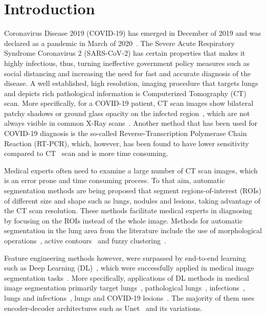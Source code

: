 \documentclass{elsarticle}
\begin{document}
\section{Introduction}\label{sec:introduction}
Coronavirus Disease 2019 (COVID-19) has emerged in December of 2019 and was declared as a pandemic in March of 2020~\cite{world2020coronavirus}.
The Severe Acute Respiratory Syndrome Coronavirus 2 (SARS-CoV-2) has certain properties that makes it highly infectious, thus, turning ineffective government policy measures such as social distancing and increasing the need for fast and accurate diagnosis of the disease.
A well established, high resolution, imaging procedure that targets lungs and depicts rich pathological information is Computerized Tomography (CT) scan.
More specifically, for a COVID-19 patient, CT scan images show bilateral patchy shadows or ground glass opacity on the infected region~\cite{wang2020clinical}, which are not always visible in common X-Ray scans~\cite{ng2020imaging}.
Another method that has been used for COVID-19 diagnosis is the so-called Reverse-Transcription Polymerase Chain Reaction (RT-PCR), which, however, has been found to have lower sensitivity compared to CT~\cite{ai2020correlation} scan and is more time consuming.

Medical experts often need to examine a large number of CT scan images, which is an error prone and time consuming process.
To that aim, automatic segmentation methods are being proposed that segment regions-of-interest (ROIs) of different size and shape such as lungs, nodules and lesions, taking advantage of the CT scan resolution.
These methods facilitate medical experts in diagnosing by focusing on the ROIs instead of the whole image.
Methods for automatic segmentation in the lung area from the literature include the use of morphological operations~\cite{hu2001automatic}, active contours~\cite{keshani2013lung} and fuzzy clustering~\cite{manikandan2016lung}.

Feature engineering methods however, were surpassed by end-to-end learning such as Deep Learning (DL)~\cite{lecun2015deep}, which were successfully applied in medical image segmentation tasks~\cite{minaee2020image}.
More specifically, applications of DL methods in medical image segmentation primarily target lungs~\cite{skourt2018lung, jin2020ai}, pathological lungs~\cite{harrison2017progressive}, infections~\cite{fan2020inf, chen2020residual, wang2020noise}, lungs and infections~\cite{yan2020covid}, lungs and COVID-19 lesions~\cite{shan2020lung}.
The majority of them uses encoder-decoder architectures such as Unet~\cite{ronneberger2015u} and its variations.
\end{document}
